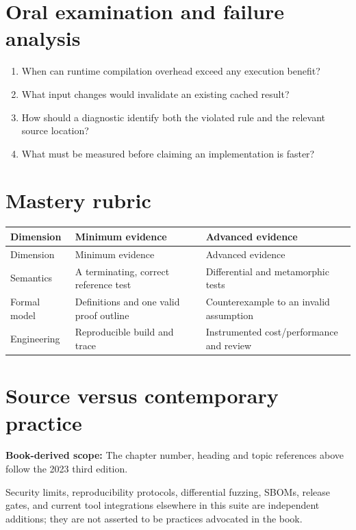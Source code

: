 \documentclass[10pt,letterpaper]{article}
\begin{document}
\section{Oral examination and failure analysis}
\begin{enumerate}
\item When can runtime compilation overhead exceed any execution benefit?
\item What input changes would invalidate an existing cached result?
\item How should a diagnostic identify both the violated rule and the relevant source location?
\item What must be measured before claiming an implementation is faster?
\end{enumerate}

\section{Mastery rubric}
\begin{longtable}{|>{\raggedright\arraybackslash}p{}|>{\raggedright\arraybackslash}p{}|>{\raggedright\arraybackslash}p{}|}
\hline
Dimension & Minimum evidence & Advanced evidence\\ \hline\endfirsthead
\hline
Dimension & Minimum evidence & Advanced evidence\\ \hline\endhead
Semantics & A terminating, correct reference test & Differential and metamorphic tests\\ \hline
Formal model & Definitions and one valid proof outline & Counterexample to an invalid assumption\\ \hline
Engineering & Reproducible build and trace & Instrumented cost/performance and review\\ \hline
\end{longtable}

\section{Source versus contemporary practice}
\textbf{Book-derived scope:} The chapter number, heading and topic references above follow the 2023 third edition.\par\modern Security limits, reproducibility protocols, differential fuzzing, SBOMs, release gates, and current tool integrations elsewhere in this suite are independent additions; they are not asserted to be practices advocated in the book.
\end{document}
